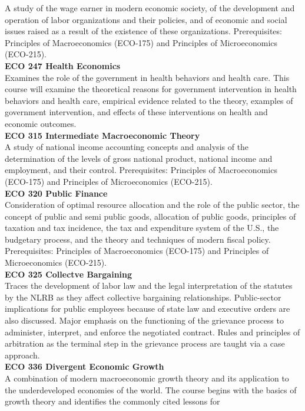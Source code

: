 \documentclass[
  letterpaper,
]{scrbook}
\begin{document}
A study of the wage earner in modern economic society, of the
development and operation of labor organizations and their policies, and
of economic and social issues raised as a result of the existence of
these organizations. Prerequisites: Principles of Macroeconomics
(ECO-175) and Principles of Microeconomics (ECO-215).\\
\textbf{ECO 247 Health Economics}\\
Examines the role of the government in health behaviors and health care.
This course will examine the theoretical reasons for government
intervention in health behaviors and health care, empirical evidence
related to the theory, examples of government intervention, and effects
of these interventions on health and economic outcomes.\\
\textbf{ECO 315 Intermediate Macroeconomic Theory}\\
A study of national income accounting concepts and analysis of the
determination of the levels of gross national product, national income
and employment, and their control. Prerequisites: Principles of
Macroeconomics (ECO-175) and Principles of Microeconomics (ECO-215).\\
\textbf{ECO 320 Public Finance}\\
Consideration of optimal resource allocation and the role of the public
sector, the concept of public and semi public goods, allocation of
public goods, principles of taxation and tax incidence, the tax and
expenditure system of the U.S., the budgetary process, and the theory
and techniques of modern fiscal policy. Prerequisites: Principles of
Macroeconomics (ECO-175) and Principles of Microeconomics (ECO-215).\\
\textbf{ECO 325 Collectve Bargaining}\\
Traces the development of labor law and the legal interpretation of the
statutes by the NLRB as they affect collective bargaining relationships.
Public-sector implications for public employees because of state law and
executive orders are also discussed. Major emphasis on the functioning
of the grievance process to administer, interpret, and enforce the
negotiated contract. Rules and principles of arbitration as the terminal
step in the grievance process are taught via a case approach.\\
\textbf{ECO 336 Divergent Economic Growth}\\
A combination of modern macroeconomic growth theory and its application
to the underdeveloped economies of the world. The course begins with the
basics of growth theory and identifies the commonly cited lessons for
\end{document}
